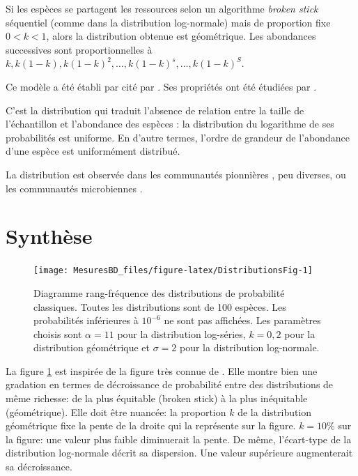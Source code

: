 \documentclass[
  11pt,
  american,
  a4paper,
  extrafontsizes,onecolumn,openright
  ]{memoir}
\begin{document}
Si les espèces se partagent les ressources selon un algorithme \emph{broken stick} séquentiel (comme dans la distribution log-normale) mais de proportion fixe \(0<k<1\), alors la distribution obtenue est géométrique.
Les abondances successives sont proportionnelles à \(k, k(1-k), k(1-k)^2, \dots, k(1-k)^s, \dots, k(1-k)^S\).

Ce modèle a été établi par \textcite{Motomura1932} cité par \textcite{May1975}.
Ses propriétés ont été étudiées par \textcite{Whittaker1972}.

C'est la distribution qui traduit l'absence de relation entre la taille de l'échantillon et l'abondance des espèces \autocite{Pueyo2007}: la distribution du logarithme de ses probabilités est uniforme.
En d'autre termes, l'ordre de grandeur de l'abondance d'une espèce est uniformément distribué.

La distribution est observée dans les communautés pionnières \autocite{Bazzaz1975}, peu diverses, ou les communautés microbiennes \autocite{Haegeman2013}.

\hypertarget{synthuxe8se}{%
\section{Synthèse}\label{synthuxe8se}}



\scriptsize

\begin{figure}

{\centering \texttt{[image: MesuresBD\_files/figure-latex/DistributionsFig-1]} 

}

\caption{Diagramme rang-fréquence des distributions de probabilité classiques. Toutes les distributions sont de 100 espèces. Les probabilités inférieures à \(10^{-6}\) ne sont pas affichées. Les paramètres choisis sont \(\alpha=11\) pour la distribution log-séries, \(k=0,2\) pour la distribution géométrique et \(\sigma=2\) pour la distribution log-normale.}\label{fig:DistributionsFig}
\end{figure}

\normalsize

La figure \ref{fig:DistributionsFig} est inspirée de la figure très connue de \textcite{Magurran1988}.
Elle montre bien une gradation en termes de décroissance de probabilité entre des distributions de même richesse: de la plus équitable (broken stick) à la plus inéquitable (géométrique).
Elle doit être nuancée: la proportion \(k\) de la distribution géométrique fixe la pente de la droite qui la représente sur la figure.
\(k=10\%\) sur la figure: une valeur plus faible diminuerait la pente.
De même, l'écart-type de la distribution log-normale décrit sa dispersion.
Une valeur supérieure augmenterait sa décroissance.
\end{document}
